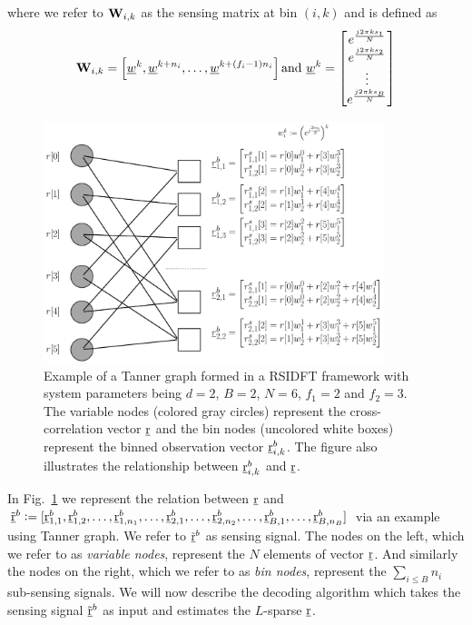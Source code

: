 \begin{enumerate}
where we refer to $\mathbf{W}_{i,k}$ as the sensing matrix at bin $(i,k)$ and is defined as  
\begin{align}\label{Eqn:Sensing Matrix}
	\mathbf{W}_{i,k} = \left[\underline{w}^{k},\underline{w}^{k+n_i},\ldots, \underline{w}^{k+(f_i-1)n_i}\right] \text{and} ~\underline{w}^{k}=
	\begin{bmatrix}
		e^{\frac{j2\pi ks_1}{N}}\\
		e^{\frac{j2\pi ks_2}{N}}\\
		\vdots\\
		e^{\frac{j2\pi ks_B}{N}}
	\end{bmatrix}
\end{align}

\begin{figure}[h!]
	\begin{center}
		\includegraphics[height=7cm]{Figures/Factorgraph} 
	\end{center}	   
	\caption{Example of a Tanner graph formed in a RSIDFT framework with system parameters being $d=2$, $B=2$, $N=6$, $f_1 = 2$ and $f_2=3$. The variable nodes (colored gray circles) represent the cross-correlation vector $\underline{\mathrm{r}}$ and the bin nodes (uncolored white boxes) represent the binned observation vector $\underline{\mathrm{r}}_{i,k}^b$. The figure also illustrates the relationship between $\underline{\mathrm{r}}_{i,k}^b$ and $\underline{\mathrm{r}}$.}\label{fig:factorgraph}
	\vspace{5 pt}
\end{figure}

In Fig.~\ref{fig:factorgraph} we represent the relation between $\underline{\mathrm{r}}$ and $\tilde{\underline{\mathrm{r}}}^{b}\mathrel{\mathop:}=[\underline{\mathrm{r}}^{b}_{1,1},\underline{\mathrm{r}}^{b}_{1,2},\ldots,\underline{\mathrm{r}}^{b}_{1,n_1},\ldots, \underline{\mathrm{r}}^{b}_{2,1},\ldots,\underline{\mathrm{r}}^{b}_{2,n_2},\ldots, \underline{\mathrm{r}}^{b}_{B,1},\ldots,\underline{\mathrm{r}}^{b}_{B,n_B}]$
via an example using Tanner graph. We refer to $\tilde{\underline{\mathrm{r}}}^{b}$ as sensing signal. The nodes on the left, which we refer to as {\it variable nodes}, represent the $N$ elements of vector $\underline{\mathrm{r}}$. And similarly the nodes on the right, which we refer to as {\it bin nodes}, represent the $\sum_{i\leq B} n_i$ sub-sensing signals. We will now describe the decoding algorithm which takes the sensing signal $\tilde{\underline{\mathrm{r}}}^b$ as input and estimates the $L$-sparse $\underline{\mathrm{r}}$.	 


\end{enumerate}

